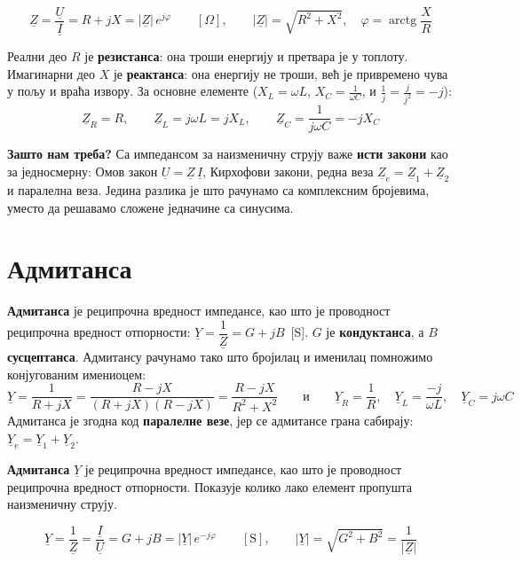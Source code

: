 \documentclass{article}
\begin{document}
\begin{kljucno}
\[
\underline{Z} = \frac{\underline{U}}{\underline{I}} = R + jX = |\underline{Z}|\,e^{j\varphi}
\qquad [\Omega],
\qquad
|\underline{Z}| = \sqrt{R^2 + X^2}, \quad \varphi = \operatorname{arctg}\frac{X}{R}
\]
\end{kljucno}

Реални део $R$ је \textbf{резистанса}: она троши енергију и претвара је у
топлоту. Имагинарни део $X$ је \textbf{реактанса}: она енергију не троши, већ је
привремено чува у пољу и враћа извору. За основне елементе ($X_L = \omega L$, $X_C = \frac{1}{\omega C}$, и
$\frac{1}{j} = \frac{j}{j^2} = -j$):
\[
\underline{Z}_R = R, \qquad
\underline{Z}_L = j\omega L = jX_L, \qquad
\underline{Z}_C = \frac{1}{j\omega C} = -jX_C
\]

\textbf{Зашто нам треба?} Са импедансом за наизменичну струју важе
\textbf{исти закони} као за једносмерну: Омов закон
$\underline{U} = \underline{Z}\,\underline{I}$, Кирхофови закони, редна веза
$\underline{Z}_e = \underline{Z}_1 + \underline{Z}_2$ и паралелна веза. Једина
разлика је што рачунамо са комплексним бројевима, уместо да решавамо сложене
једначине са синусима.

\section{Адмитанса}

\textbf{Адмитанса} је реципрочна вредност импедансе, као што је проводност
реципрочна вредност отпорности: $\underline{Y} = \dfrac{1}{\underline{Z}} = G + jB$~[S].
$G$ је \textbf{кондуктанса}, а $B$ \textbf{сусцептанса}. Адмитансу рачунамо
тако што бројилац и именилац помножимо конјугованим имениоцем:
\[
\underline{Y} = \frac{1}{R + jX} = \frac{R - jX}{(R + jX)(R - jX)} = \frac{R - jX}{R^2 + X^2}
\qquad\text{и}\qquad
\underline{Y}_R = \frac{1}{R}, \quad
\underline{Y}_L = \frac{-j}{\omega L}, \quad
\underline{Y}_C = j\omega C
\]
Адмитанса је згодна код \textbf{паралелне везе}, јер се адмитансе грана
сабирају: $\underline{Y}_e = \underline{Y}_1 + \underline{Y}_2$.

\textbf{Адмитанса} $\underline{Y}$ је реципрочна вредност импедансе, као што
је проводност реципрочна вредност отпорности. Показује колико лако елемент
пропушта наизменичну струју.

\begin{kljucno}
\[
\underline{Y} = \frac{1}{\underline{Z}} = \frac{\underline{I}}{\underline{U}} = G + jB = |\underline{Y}|\,e^{-j\varphi}
\qquad [\text{S}],
\qquad
|\underline{Y}| = \sqrt{G^2 + B^2} = \frac{1}{|\underline{Z}|}
\]
\end{kljucno}
\end{document}
